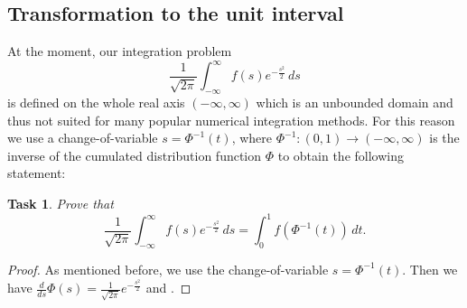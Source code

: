 \documentclass{scrartcl}
\newtheorem{task}{Task}
\begin{document}
	\subsection{Transformation to the unit interval}
	At the moment, our integration problem
	\begin{equation*}
		\frac{1}{\sqrt{2\pi}}\int_{-\infty}^{\infty} f(s) e^{-\frac{s^2}{2}}\,ds
	\end{equation*}
	is defined on the whole real axis $(-\infty, \infty)$ which is an unbounded domain and thus not suited for many popular numerical integration methods. For this reason we use a change-of-variable $s = \Phi^{-1}(t)$, where $\Phi^{-1}:(0,1)\rightarrow(-\infty,\infty)$ is the inverse of the cumulated distribution function $\Phi$ to obtain the following statement:
	\begin{task}
		Prove that
		\begin{equation}
			\frac{1}{\sqrt{2\pi}}\int_{-\infty}^{\infty} f(s) e^{-\frac{s^2}{2}}\,ds = \int_{0}^{1}f(\Phi^{-1}(t))\,dt\text{.}
		\end{equation}
	\end{task}
	\begin{proof}
		As mentioned before, we use the change-of-variable $s = \Phi^{-1}(t)$. Then we have $\frac{d}{ds}\Phi(s)=\frac{1}{\sqrt{2\pi}}e^{-\frac{s^2}{2}}$ and .
	\end{proof}
\end{document}
